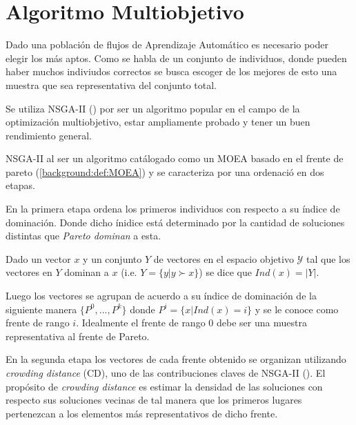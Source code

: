 \section{Algoritmo Multiobjetivo}


Dado una poblaci\'on de flujos de Aprendizaje Autom\'atico es necesario poder elegir los m\'as aptos. Como se habla de un conjunto de individuos, donde pueden haber muchos indiviudos correctos se busca escoger de los mejores de esto una muestra que sea representativa del conjunto total.

Se utiliza NSGA-II (\cite{deb2002fast}) por ser un algoritmo popular en el campo de la optimizaci\'on multiobjetivo, estar ampliamente probado y tener un buen rendimiento general. 

NSGA-II al ser un algoritmo cat\'alogado como un MOEA basado en el frente de pareto (\ref{background:def:MOEA}) y se caracteriza por una ordenaci\'o en dos etapas.

En la primera etapa ordena los primeros individuos con respecto a su \'indice de dominaci\'on. Donde dicho \'inidice  est\'a determinado por la cantidad de soluciones distintas que \textit{Pareto dominan} a esta.
\begin{definition}
    Dado un vector $x$ y un conjunto $Y$ de vectores en el espacio objetivo $\mathcal{Y}$ tal que los vectores en $Y$ dominan a $x$ (i.e. $Y = \{y | y \succ x\}$) se dice que $Ind(x) = |Y|$.
\end{definition}
Luego los vectores se agrupan de acuerdo a su \'indice de dominaci\'on  de la siguiente manera
$\{P^0, ..., P^k\}$ donde  $P^i = \{x | Ind(x) = i\}$ y se le conoce como frente de rango $i$. Idealmente el frente de rango $0$ debe ser una muestra representativa al frente de Pareto.

En la segunda etapa los vectores de cada frente obtenido se organizan utilizando \textit{crowding distance} (CD), uno de las contribuciones claves de NSGA-II (\cite{deb2002fast}). El prop\'osito de \textit{crowding distance} es estimar la densidad de las soluciones con respecto sus soluciones vecinas de tal manera que los primeros lugares pertenezcan a los elementos m\'as representativos de dicho frente.

